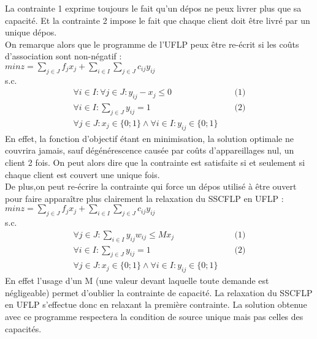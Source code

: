 \documentclass[12pt,a4paper]{article}
\begin{document}
La contrainte 1 exprime toujours le fait qu'un dépos ne peux livrer plus que sa capacité. Et la contrainte 2 impose le fait que chaque client doit être livré par un unique dépos.\\

On remarque alors que le programme de l'UFLP peux être re-écrit si les coûts d'association sont non-négatif :\\
$min z = \sum \limits_{j \in J} f_j x_j + \sum \limits_{i \in I} \sum \limits_{j \in J} c_{ij} y_{ij}$\\
s.c.
\begin{align*}
 \forall i \in I : \forall j \in J : y_{ij} - x_j \leqslant 0 & & \text{ (1)} \\
 \forall i \in I : \sum \limits_{j \in J} y_{ij} = 1 & & \text{ (2)} \\
 \forall j \in J : x_j \in \{0;1\} \land \forall i \in I  : y_{ij} \in \{0;1\} 
\end{align*}
En effet, la fonction d’objectif étant en minimisation, la solution optimale ne couvrira jamais, sauf dégénérescence causée par coûts d’appareillages nul, un client 2 fois. On peut alors dire que la contrainte est satisfaite si et seulement si chaque client est couvert une unique fois.\\
De plus,on peut re-écrire la contrainte qui force un dépos utilisé à être ouvert pour faire apparaître plus clairement la relaxation du SSCFLP en UFLP :\\
$min z = \sum \limits_{j \in J} f_j x_j + \sum \limits_{i \in I} \sum \limits_{j \in J} c_{ij} y_{ij}$\\
s.c.
\begin{align*}
 \forall j \in J : \sum \limits_{i \in I} y_{ij} w_{ij} \leqslant M x_j & & \text{ (1)} \\
 \forall i \in I : \sum \limits_{j \in J} y_{ij} = 1 & & \text{ (2)} \\
 \forall j \in J : x_j \in \{0;1\} \land \forall i \in I  : y_{ij} \in \{0;1\} 
\end{align*}
En effet l'usage d'un M (une valeur devant laquelle toute demande est négligeable) permet d'oublier la contrainte de capacité. La relaxation du SSCFLP en UFLP s’effectue donc en relaxant la première contrainte. La solution obtenue avec ce programme respectera la condition de source unique mais pas celles des capacités.\\
\end{document}
